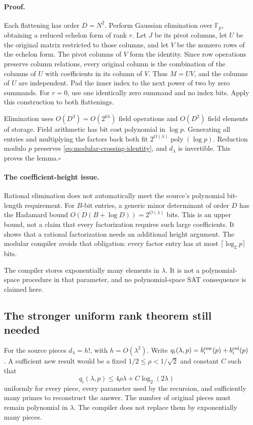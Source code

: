\paragraph{Proof.}
Each flattening has order $D=N^2$. Perform Gaussian elimination over
$\mathbb F_p$, obtaining a reduced echelon form of rank $r$. Let $J$
be its pivot columns, let $U$ be the original matrix restricted to
those columns, and let $V$ be the nonzero rows of the echelon form.
The pivot columns of $V$ form the identity. Since row operations
preserve column relations, every original column is the combination
of the columns of $U$ with coefficients in its column of $V$.
Thus $M=UV$, and the columns of $U$ are independent. Pad the inner
index to the next power of two by zero summands. For $r=0$, use one
identically zero summand and no index bits. Apply this construction
to both flattenings.

Elimination uses $O(D^3)=O(2^{6\lambda})$ field operations and
$O(D^2)$ field elements of storage. Field arithmetic has bit cost
polynomial in $\log p$. Generating all entries and multiplying the
factors back both fit $2^{O(\lambda)}\operatorname{poly}(\log p)$.
Reduction modulo $p$ preserves
\eqref{eq:modular-crossing-identity}, and $d_\lambda$ is invertible.
This proves the lemma.\hfill$\square$

\paragraph{The coefficient-height issue.}
Rational elimination does not automatically meet the source's
polynomial bit-length requirement. For $B$-bit entries, a generic
minor determinant of order $D$ has the Hadamard bound
$O(D(B+\log D))=2^{O(\lambda)}$ bits. This is an upper bound,
not a claim that every factorization requires such large coefficients.
It shows that a rational factorization needs an additional height
argument. The modular compiler avoids that obligation: every factor
entry has at most $\lceil\log_2p\rceil$ bits.

The compiler stores exponentially many elements in $\lambda$.
It is not a polynomial-space procedure in that parameter, and no
polynomial-space SAT consequence is claimed here.

\subsection{The stronger uniform rank theorem still needed}

For the source pieces $d_\lambda=h!$, with $h=O(\lambda^2)$. Write
$q_i(\lambda,p)=b_i^{\rm row}(p)+b_i^{\rm col}(p)$. A sufficient
new result would be a fixed
$1/2\le\rho<1/\sqrt2$ and constant $C$ such that
\begin{equation}\label{eq:modular-stronger-rank-goal}
 q_i(\lambda,p)\le4\rho\lambda+C\log_2(2\lambda)
\end{equation}
uniformly for every piece, every parameter used by the recursion,
and sufficiently many primes to reconstruct the answer.
The number of original pieces must remain polynomial in $\lambda$.
The compiler does not replace them by exponentially many pieces.

